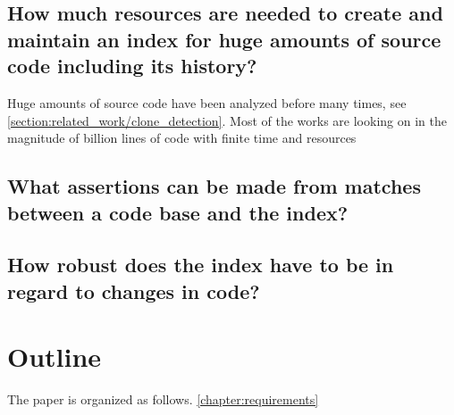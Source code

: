 \subsection*{How much resources are needed to create and maintain an index for huge amounts of source code including its history?}
Huge amounts of source code have been analyzed before many times, see \ref{section:related_work/clone_detection}.
Most of the works are looking on 
 in the magnitude of billion lines of code 
 with finite time and resources

\subsection*{What assertions can be made from matches between a code base and the index?}
\subsection*{How robust does the index have to be in regard to changes in code?}



\section{Outline}
The paper is organized as follows.
\autoref{chapter:requirements}